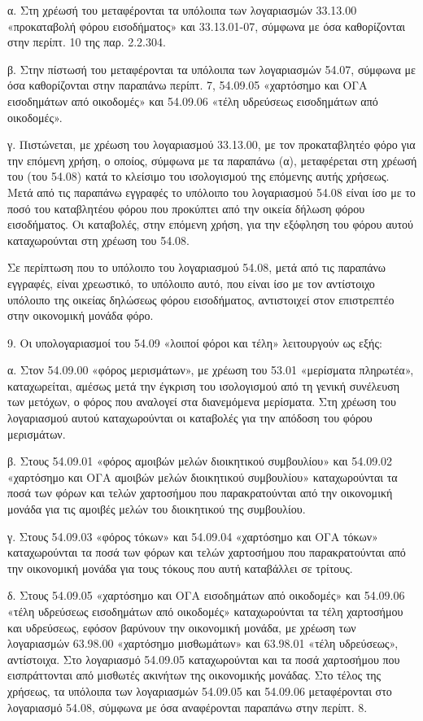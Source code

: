\documentclass[A4,10pt,greek]{book}
\begin{document}
α. Στη χρέωσή του μεταφέρονται τα υπόλοιπα των λογαριασμών 33.13.00 «προκαταβολή φόρου εισοδήματος» και 33.13.01-07, σύμφωνα με όσα καθορίζονται στην περίπτ. 10 της παρ. 2.2.304.

β. Στην πίστωσή του μεταφέρονται τα υπόλοιπα των λογαριασμών 54.07, σύμφωνα με όσα καθορίζονται στην παραπάνω περίπτ. 7, 54.09.05 «χαρτόσημο και ΟΓΑ εισοδημάτων από οικοδομές» και 54.09.06 «τέλη υδρεύσεως εισοδημάτων από οικοδομές».

γ. Πιστώνεται, με χρέωση του λογαριασμού 33.13.00, με τον προκαταβλητέο φόρο για την επόμενη χρήση, ο οποίος, σύμφωνα με τα παραπάνω (α), μεταφέρεται στη χρέωσή του (του 54.08) κατά το κλείσιμο του ισολογισμού της επόμενης αυτής χρήσεως. Μετά από τις παραπάνω εγγραφές το υπόλοιπο του λογαριασμού 54.08 είναι ίσο με το ποσό του καταβλητέου φόρου που προκύπτει από την οικεία δήλωση φόρου εισοδήματος. Οι καταβολές, στην επόμενη χρήση, για την εξόφληση του φόρου αυτού καταχωρούνται στη χρέωση του 54.08.

Σε περίπτωση που το υπόλοιπο του λογαριασμού 54.08, μετά από τις παραπάνω εγγραφές, είναι χρεωστικό, το υπόλοιπο αυτό, που είναι ίσο με τον αντίστοιχο υπόλοιπο της οικείας δηλώσεως φόρου εισοδήματος, αντιστοιχεί στον επιστρεπτέο στην οικονομική μονάδα φόρο.

9. Οι υπολογαριασμοί του 54.09 «λοιποί φόροι και τέλη» λειτουργούν ως εξής:

α. Στον 54.09.00 «φόρος μερισμάτων», με χρέωση του 53.01 «μερίσματα πληρωτέα», καταχωρείται, αμέσως μετά την έγκριση του ισολογισμού από τη γενική συνέλευση των μετόχων, ο φόρος που αναλογεί στα διανεμόμενα μερίσματα. Στη χρέωση του λογαριασμού αυτού καταχωρούνται οι καταβολές για την απόδοση του φόρου μερισμάτων.

β. Στους 54.09.01 «φόρος αμοιβών μελών διοικητικού συμβουλίου» και 54.09.02 «χαρτόσημο και ΟΓΑ αμοιβών μελών διοικητικού συμβουλίου» καταχωρούνται τα ποσά των φόρων και τελών χαρτοσήμου που παρακρατούνται από την οικονομική μονάδα για τις αμοιβές μελών του διοικητικού της συμβουλίου.

γ. Στους 54.09.03 «φόρος τόκων» και 54.09.04 «χαρτόσημο και ΟΓΑ τόκων» καταχωρούνται τα ποσά των φόρων και τελών χαρτοσήμου που παρακρατούνται από την οικονομική μονάδα για τους τόκους που αυτή καταβάλλει σε τρίτους.

δ. Στους 54.09.05 «χαρτόσημο και ΟΓΑ εισοδημάτων από οικοδομές» και 54.09.06 «τέλη υδρεύσεως εισοδημάτων από οικοδομές» καταχωρούνται τα τέλη χαρτοσήμου και υδρεύσεως, εφόσον βαρύνουν την οικονομική μονάδα, με χρέωση των λογαριασμών 63.98.00 «χαρτόσημο μισθωμάτων» και 63.98.01 «τέλη υδρεύσεως», αντίστοιχα. Στο λογαριασμό 54.09.05 καταχωρούνται και τα ποσά χαρτοσήμου που εισπράττονται από μισθωτές ακινήτων της οικονομικής μονάδας. Στο τέλος της χρήσεως, τα υπόλοιπα των λογαριασμών 54.09.05 και 54.09.06 μεταφέρονται στο λογαριασμό 54.08, σύμφωνα με όσα αναφέρονται παραπάνω στην περίπτ. 8.
\end{document}
